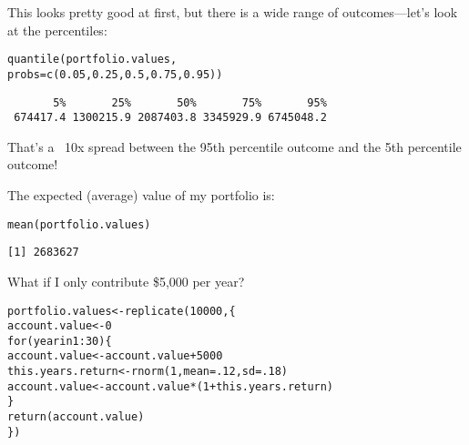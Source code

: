 \documentclass{beamer}\usepackage[]{graphicx}\usepackage[]{color}
\makeatletter
\newcommand{\hlnum}[1]{\textcolor[rgb]{0.824,0.412,0.118}{#1}}%
\newcommand{\hlopt}[1]{\textcolor[rgb]{1,0.894,0.769}{#1}}%
\newcommand{\hlstd}[1]{\textcolor[rgb]{1,0.894,0.769}{#1}}%
\newcommand{\hlkwa}[1]{\textcolor[rgb]{0.941,0.902,0.549}{#1}}%
\newcommand{\hlkwb}[1]{\textcolor[rgb]{0.804,0.776,0.451}{#1}}%
\newcommand{\hlkwc}[1]{\textcolor[rgb]{0.78,0.941,0.545}{#1}}%
\newcommand{\hlkwd}[1]{\textcolor[rgb]{1,0.78,0.769}{#1}}%
\newenvironment{kframe}{%
 \def\at@end@of@kframe{}%
 \ifinner\ifhmode%
  \def\at@end@of@kframe{\end{minipage}}%
  \begin{minipage}{\columnwidth}%
 \fi\fi%
 \def\FrameCommand##1{\hskip\@totalleftmargin \hskip-\fboxsep
 \colorbox{shadecolor}{##1}\hskip-\fboxsep
     \hskip-\linewidth \hskip-\@totalleftmargin \hskip\columnwidth}%
 \MakeFramed {\advance\hsize-\width
   \@totalleftmargin\z@ \linewidth\hsize
   \@setminipage}}%
 {\par\unskip\endMakeFramed%
 \at@end@of@kframe}
\newenvironment{knitrout}{}{} %
\makeatother
\begin{document}
\begin{darkframes}
    \begin{frame}[fragile]
      This looks pretty good at first, but there is a wide range of outcomes---let's look at the percentiles:
\begin{knitrout}
\begin{kframe}
\begin{alltt}
\hlkwd{quantile}\hlstd{(portfolio.values,}
  \hlkwc{probs}\hlstd{=}\hlkwd{c}\hlstd{(}\hlnum{0.05}\hlstd{,} \hlnum{0.25}\hlstd{,} \hlnum{0.5}\hlstd{,} \hlnum{0.75}\hlstd{,} \hlnum{0.95}\hlstd{))}
\end{alltt}
\begin{verbatim}
       5%       25%       50%       75%       95% 
 674417.4 1300215.9 2087403.8 3345929.9 6745048.2 
\end{verbatim}
\end{kframe}
\end{knitrout}
      That's a ~10x spread between the 95th percentile outcome and the 5th percentile outcome!

      \pause
      \bigskip
      The expected (average) value of my portfolio is:
\begin{knitrout}
\begin{kframe}
\begin{alltt}
\hlkwd{mean}\hlstd{(portfolio.values)}
\end{alltt}
\begin{verbatim}
[1] 2683627
\end{verbatim}
\end{kframe}
\end{knitrout}
    \end{frame}

    \begin{frame}[fragile]{What if I only contribute \$5,000 per year?}
      \fontsize{9}{9}\selectfont
\begin{knitrout}
\begin{kframe}
\begin{alltt}
\hlstd{portfolio.values} \hlkwb{<-} \hlkwd{replicate}\hlstd{(}\hlnum{10000}\hlstd{, \{}
  \hlstd{account.value} \hlkwb{<-} \hlnum{0}
  \hlkwa{for} \hlstd{(year} \hlkwa{in} \hlnum{1}\hlopt{:}\hlnum{30}\hlstd{) \{}
    \hlstd{account.value} \hlkwb{<-} \hlstd{account.value} \hlopt{+} \hlnum{5000}
    \hlstd{this.years.return} \hlkwb{<-} \hlkwd{rnorm}\hlstd{(}\hlnum{1}\hlstd{,} \hlkwc{mean}\hlstd{=}\hlnum{.12}\hlstd{,} \hlkwc{sd}\hlstd{=}\hlnum{.18}\hlstd{)}
    \hlstd{account.value} \hlkwb{<-} \hlstd{account.value} \hlopt{*} \hlstd{(}\hlnum{1} \hlopt{+} \hlstd{this.years.return)}
  \hlstd{\}}
  \hlkwd{return}\hlstd{(account.value)}
\hlstd{\})}
\end{alltt}
\end{kframe}
\end{knitrout}
    \end{frame}


\end{darkframes}
\end{document}
